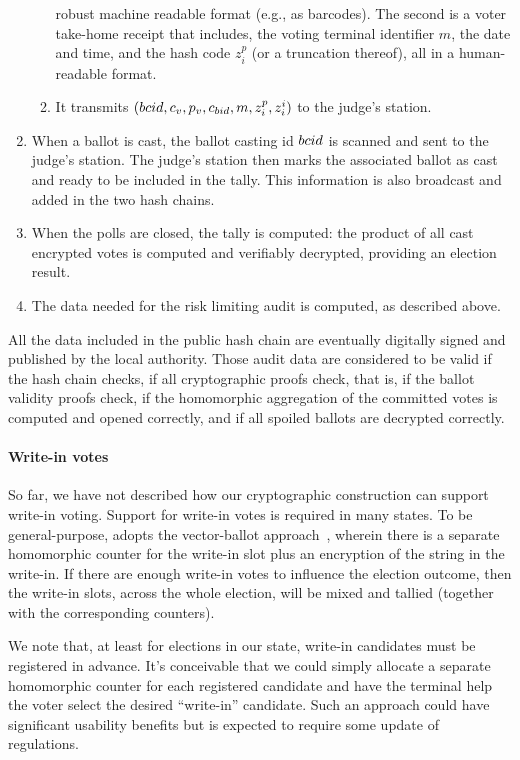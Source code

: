 \begin{enumerate}
\begin{enumerate}
    robust machine readable format (e.g., as barcodes). The second is
    a voter take-home receipt that includes, the voting terminal
    identifier $m$, the date and time, and the hash code $z^p_i$ (or a
    truncation thereof), all in a human-readable format.
  \item It transmits $({bcid}, c_v, p_v, c_{bid}, m, z^p_i, z^i_i)$ to
    the judge's station.
  \end{enumerate}
\item When a ballot is cast, the ballot casting id ${bcid}$ is scanned
  and sent to the judge's station.  The judge's station then marks the
  associated ballot as cast and ready to be included in the
  tally. This information is also broadcast and added in the two hash
  chains.
\item When the polls are closed, the tally is computed: the product of
  all cast encrypted votes is computed and verifiably decrypted,
  providing an election result.
\item The data needed for the risk limiting audit is computed, as described above. 
\end{enumerate}

All the data included in the public hash chain are eventually
digitally signed and published by the local authority. Those audit
data are considered to be valid if the hash chain checks, if all
cryptographic proofs check, that is, if the ballot validity proofs
check, if the homomorphic aggregation of the committed votes is
computed and opened correctly, and if all spoiled ballots are
decrypted correctly.

\paragraph{Write-in votes}
So far, we have not described how our cryptographic construction can
support write-in voting. Support for write-in votes is required in
many states. To be general-purpose, \projname adopts
the vector-ballot approach~\cite{kiayias04vectorBallot}, wherein there
is a separate homomorphic counter for the write-in slot plus an
encryption of the string in the write-in. If there are enough write-in
votes to influence the election outcome, then the write-in slots,
across the whole election, will be mixed and tallied (together with
the corresponding counters).

We note that, at least for elections in our state, write-in candidates must be
registered in advance. It's conceivable that we could simply allocate
a separate homomorphic counter for each registered candidate and have
the \projname terminal help the voter select the desired ``write-in''
candidate. Such an approach could have significant usability benefits
but is expected to require some update of regulations.

